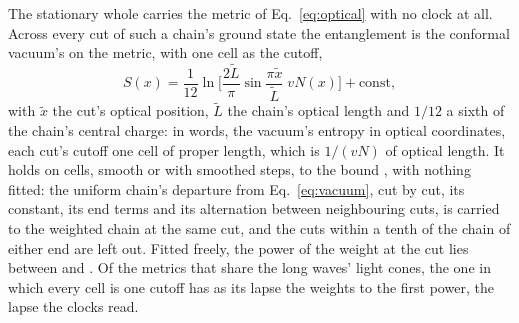 \documentclass[aps,prd,reprint,superscriptaddress]{revtex4-2}
\begin{document}
The stationary whole carries the metric of Eq.~\eqref{eq:optical} with no clock at all. Across every cut of such a chain's ground state the entanglement is the conformal vacuum's on the metric, with one cell as the cutoff,
\begin{equation}
  S(x) = \frac{1}{12} \ln\!\Big[\frac{2\tilde L}{\pi} \sin\frac{\pi \tilde x}{\tilde L}\; vN(x)\Big] + \text{const},
  \label{eq:vacuum}
\end{equation}
with $\tilde x$ the cut's optical position, $\tilde L$ the chain's optical length and $1/12$ a sixth of the chain's central charge: in words, the vacuum's entropy in optical coordinates, each cut's cutoff one cell of proper length, which is $1/(vN)$ of optical length. It holds on  cells, smooth or with smoothed steps, to the bound , with nothing fitted: the uniform chain's departure from Eq.~\eqref{eq:vacuum}, cut by cut, its constant, its end terms and its alternation between neighbouring cuts, is carried to the weighted chain at the same cut, and the cuts within a tenth of the chain of either end are left out. Fitted freely, the power of the weight at the cut lies between  and . Of the metrics that share the long waves' light cones, the one in which every cell is one cutoff has as its lapse the weights to the first power, the lapse the clocks read.
\end{document}
